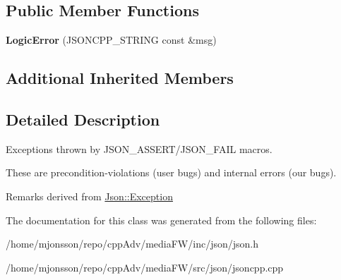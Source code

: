 \subsection*{Public Member Functions}
\begin{DoxyCompactItemize}
\item 
\mbox{\label{classJson_1_1LogicError_acca679aa49768a4a1de7b705c67c2919}} 
{\bfseries Logic\+Error} (J\+S\+O\+N\+C\+P\+P\+\_\+\+S\+T\+R\+I\+NG const \&msg)
\end{DoxyCompactItemize}
\subsection*{Additional Inherited Members}


\subsection{Detailed Description}
Exceptions thrown by J\+S\+O\+N\+\_\+\+A\+S\+S\+E\+R\+T/\+J\+S\+O\+N\+\_\+\+F\+A\+IL macros.

These are precondition-\/violations (user bugs) and internal errors (our bugs).

\begin{DoxyRemark}{Remarks}
derived from \hyperlink{classJson_1_1Exception}{Json\+::\+Exception} 
\end{DoxyRemark}


The documentation for this class was generated from the following files\+:\begin{DoxyCompactItemize}
\item 
/home/mjonsson/repo/cpp\+Adv/media\+F\+W/inc/json/json.\+h\item 
/home/mjonsson/repo/cpp\+Adv/media\+F\+W/src/json/jsoncpp.\+cpp\end{DoxyCompactItemize}

